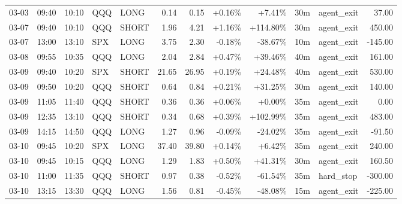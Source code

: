 \documentclass[11pt,a4paper,twoside]{article}
\begin{document}
\begin{center}
\begin{longtable}{>{\color{txtmain}}l l l l l r r r r r >{\color{txtmain}}l r}
03-03 & 09:40 & 10:10 & QQQ & LONG & 0.14 & 0.15 & \textcolor{wingreen}{+0.16\%} & \textcolor{wingreen}{+7.41\%} & 30m & agent\_exit & \textcolor{wingreen}{37.00} \\
03-07 & 09:40 & 10:10 & QQQ & SHORT & 1.96 & 4.21 & \textcolor{wingreen}{+1.16\%} & \textcolor{wingreen}{+114.80\%} & 30m & agent\_exit & \textcolor{wingreen}{450.00} \\
03-07 & 13:00 & 13:10 & SPX & LONG & 3.75 & 2.30 & \textcolor{lossred}{-0.18\%} & \textcolor{lossred}{-38.67\%} & 10m & agent\_exit & \textcolor{lossred}{-145.00} \\
03-08 & 09:55 & 10:35 & QQQ & LONG & 2.04 & 2.84 & \textcolor{wingreen}{+0.47\%} & \textcolor{wingreen}{+39.46\%} & 40m & agent\_exit & \textcolor{wingreen}{161.00} \\
03-09 & 09:40 & 10:20 & SPX & SHORT & 21.65 & 26.95 & \textcolor{wingreen}{+0.19\%} & \textcolor{wingreen}{+24.48\%} & 40m & agent\_exit & \textcolor{wingreen}{530.00} \\
03-09 & 09:50 & 10:20 & QQQ & SHORT & 0.64 & 0.84 & \textcolor{wingreen}{+0.21\%} & \textcolor{wingreen}{+31.25\%} & 30m & agent\_exit & \textcolor{wingreen}{140.00} \\
03-09 & 11:05 & 11:40 & QQQ & SHORT & 0.36 & 0.36 & \textcolor{wingreen}{+0.06\%} & \textcolor{wingreen}{+0.00\%} & 35m & agent\_exit & \textcolor{wingreen}{0.00} \\
03-09 & 12:35 & 13:10 & QQQ & SHORT & 0.34 & 0.68 & \textcolor{wingreen}{+0.39\%} & \textcolor{wingreen}{+102.99\%} & 35m & agent\_exit & \textcolor{wingreen}{483.00} \\
03-09 & 14:15 & 14:50 & QQQ & LONG & 1.27 & 0.96 & \textcolor{lossred}{-0.09\%} & \textcolor{lossred}{-24.02\%} & 35m & agent\_exit & \textcolor{lossred}{-91.50} \\
03-10 & 09:45 & 10:20 & SPX & LONG & 37.40 & 39.80 & \textcolor{wingreen}{+0.14\%} & \textcolor{wingreen}{+6.42\%} & 35m & agent\_exit & \textcolor{wingreen}{240.00} \\
03-10 & 09:45 & 10:15 & QQQ & LONG & 1.29 & 1.83 & \textcolor{wingreen}{+0.50\%} & \textcolor{wingreen}{+41.31\%} & 30m & agent\_exit & \textcolor{wingreen}{160.50} \\
03-10 & 11:00 & 11:35 & QQQ & SHORT & 0.97 & 0.38 & \textcolor{lossred}{-0.52\%} & \textcolor{lossred}{-61.54\%} & 35m & hard\_stop & \textcolor{lossred}{-300.00} \\
03-10 & 13:15 & 13:30 & QQQ & LONG & 1.56 & 0.81 & \textcolor{lossred}{-0.45\%} & \textcolor{lossred}{-48.08\%} & 15m & agent\_exit & \textcolor{lossred}{-225.00} \\

\end{longtable}
\end{center}
\end{document}
